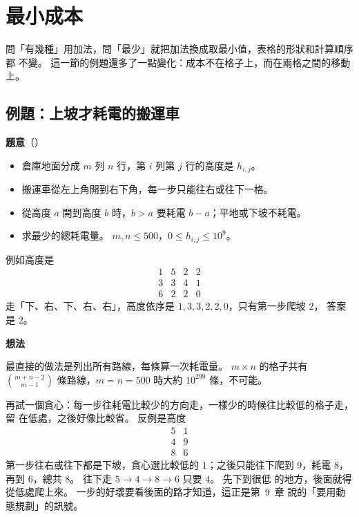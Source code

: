 \section{最小成本}
\label{sec:dp2-cost}

問「有幾種」用加法，問「最少」就把加法換成取最小值，表格的形狀和計算順序都
不變。 這一節的例題還多了一點變化：成本不在格子上，而在兩格之間的移動上。

\subsection{例題：上坡才耗電的搬運車}
\label{sec:dp2-ex-uphill}

\textbf{題意}（）

\begin{itemize}
\item 倉庫地面分成 $m$ 列 $n$ 行，第 $i$ 列第 $j$ 行的高度是 $h_{i,j}$。
\item 搬運車從左上角開到右下角，每一步只能往右或往下一格。
\item 從高度 $a$ 開到高度 $b$ 時，$b > a$ 要耗電 $b - a$；平地或下坡不耗電。
\item 求最少的總耗電量。 $m, n \le 500$，$0 \le h_{i,j} \le 10^9$。
\end{itemize}

例如高度是
\[
\begin{matrix}
1 & 5 & 2 & 2 \\
3 & 3 & 4 & 1 \\
6 & 2 & 2 & 0
\end{matrix}
\]
走「下、右、下、右、右」，高度依序是 $1, 3, 3, 2, 2, 0$，只有第一步爬坡 $2$，
答案是 $2$。

\textbf{想法}

最直接的做法是列出所有路線，每條算一次耗電量。 $m \times n$ 的格子共有
$\binom{m + n - 2}{m - 1}$ 條路線，$m = n = 500$ 時大約 $10^{299}$ 條，不可能。

再試一個貪心：每一步往耗電比較少的方向走，一樣少的時候往比較低的格子走，留
在低處，之後好像比較省。 反例是高度
\[
\begin{matrix}
5 & 1 \\
4 & 9 \\
8 & 6
\end{matrix}
\]
第一步往右或往下都是下坡，貪心選比較低的 $1$；之後只能往下爬到 $9$，耗電
$8$，再到 $6$，總共 $8$。 往下走 $5 \to 4 \to 8 \to 6$ 只要 $4$。 先下到很低
的地方，後面就得從低處爬上來。 一步的好壞要看後面的路才知道，這正是第~9~章
說的「要用動態規劃」的訊號。

